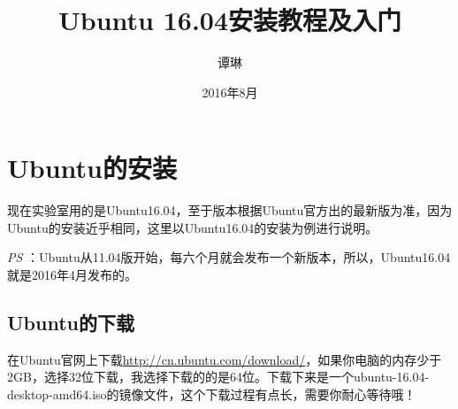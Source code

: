 \documentclass{article}
\begin{document}
\title{\vspace{-2em}Ubuntu 16.04安装教程及入门\vspace{0.7em}}%
\author{谭琳}%
\date{\vspace{-0.7em}2016年8月\vspace{-0.7em}}%
\maketitle\thispagestyle{fancy}%


\setcounter{page}{0}

\newpage

\tableofcontents 
\newpage

\pagestyle{fancy}

\newpage
\renewcommand{\headrulewidth}{0.4pt}
\renewcommand{\footrulewidth}{0.4pt}
            

\section{Ubuntu的安装}

现在实验室用的是Ubuntu16.04，至于版本根据Ubuntu官方出的最新版为准，因为Ubuntu的安装近乎相同，这里以Ubuntu16.04的安装为例进行说明。

\textsl{PS} ：Ubuntu从11.04版开始，每六个月就会发布一个新版本，所以，Ubuntu16.04就是2016年4月发布的。

\subsection{Ubuntu的下载}

  在Ubuntu官网上下载\url{http://cn.ubuntu.com/download/}，如果你电脑的内存少于2GB，选择32位下载，我选择下载的的是64位。下载下来是一个ubuntu-16.04-desktop-amd64.iso的镜像文件，这个下载过程有点长，需要你耐心等待哦！
\end{document}
